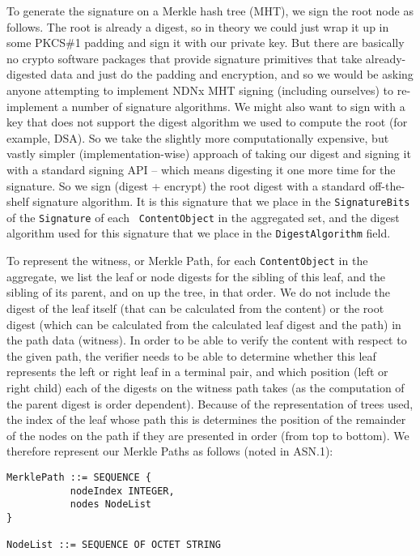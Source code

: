 To generate the signature on a Merkle hash tree (MHT), we sign the
root node as follows. The root is already a digest, so in theory we
could just wrap it up in some PKCS\#1 padding and sign it with our
private key. But there are basically no crypto software packages that
provide signature primitives that take already-digested data and just
do the padding and encryption, and so we would be asking anyone
attempting to implement NDNx MHT signing (including ourselves) to
re-implement a number of signature algorithms. We might also want to
sign with a key that does not support the digest algorithm we used to
compute the root (for example, DSA). So we take the slightly more
computationally expensive, but vastly simpler (implementation-wise)
approach of taking our digest and signing it with a standard signing
API -- which means digesting it one more time for the signature. So
we sign (digest + encrypt) the root digest with a standard
off-the-shelf signature algorithm. It is this signature that we place
in the {\tt SignatureBits} of the {\tt Signature} of each {\tt
  ContentObject} in the aggregated set, and the digest algorithm used
for this signature that we place in the {\tt DigestAlgorithm} field.

To represent the witness, or Merkle Path, for each {\tt ContentObject}
in the aggregate, we list the leaf or node digests for the sibling of
this leaf, and the sibling of its parent, and on up the tree, in that
order. We do not include the digest of the leaf itself (that can be
calculated from the content) or the root digest (which can be
calculated from the calculated leaf digest and the path) in the path
data (witness). In order to be able to verify the content with respect
to the given path, the verifier needs to be able to determine whether
this leaf represents the left or right leaf in a terminal pair, and
which position (left or right child) each of the digests on the
witness path takes (as the computation of the parent digest is order
dependent). Because of the representation of trees used, the index of
the leaf whose path this is determines the position of the remainder
of the nodes on the path if they are presented in order (from top to
bottom). We therefore represent our Merkle Paths as follows (noted in
ASN.1):

\begin{verbatim}
MerklePath ::= SEQUENCE {       
           nodeIndex INTEGER,   
           nodes NodeList       
}                           

NodeList ::= SEQUENCE OF OCTET STRING 
\end{verbatim}

